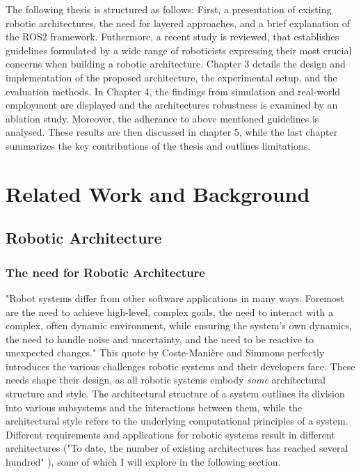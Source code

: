 \documentclass[%
paper=A4,               %
twoside=true,           %
openright,              %
11pt,                   %
bibliography=totoc,     %
titlepage=on,           %
DIV=12,                 %
BCOR=1.5cm,             %
parskip=half,            %
final
]{scrreprt}
\begin{document}
	The following thesis is structured as follows: First, a presentation of existing robotic architectures, the need for layered approaches, and a brief explanation of the ROS2 framework. Futhermore, a recent study is reviewed, that establishes guidelines formulated by a wide range of roboticists expressing their most crucial concerns when building a robotic architecture. Chapter 3 details the design and implementation of the proposed architecture, the experimental setup, and the evaluation methods. In Chapter 4, the findings from simulation and real-world employment are displayed and the architectures robustness is examined by an ablation study. Moreover,  the adherance to above mentioned guidelines is analysed. These results are then discussed in chapter 5, while the last chapter summarizes the key contributions of the thesis and outlines limitations.
	
	
	\chapter{Related Work and Background}
	\section{Robotic Architecture}
	\subsection{The need for Robotic Architecture}
	"Robot systems differ from other software applications in many ways. Foremost are the need to achieve high-level, complex goals, the need to interact with a complex, often dynamic environment, while ensuring the system’s own dynamics, the need to handle noise and uncertainty, and the need to be reactive to unexpected changes." \autocite{coste-maniereArchitectureBackboneRobotic2000} This quote by Coste-Mani\`{e}re and Simmons perfectly introduces the various challenges robotic systems and their developers face. These needs shape their design, as all robotic systems embody \textit{some} architectural structure and style. The architectural structure of a system outlines its division into various subsystems and the interactions between them, while the architectural style refers to the underlying computational principles of a system. \autocite{coste-maniereArchitectureBackboneRobotic2000} Different requirements and applications for robotic systems result in different architectures ("To date, the number of existing architectures has reached several hundred" \autocite{kotseruba40YearsCognitive2020}), some of which I will explore in the following section.
	
\end{document}
